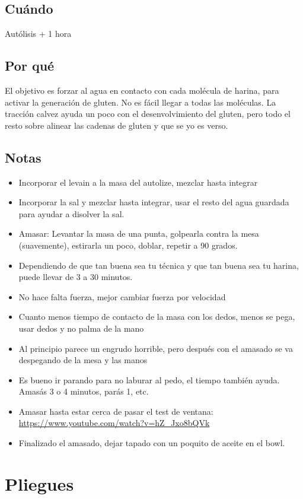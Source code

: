 \documentclass[10pt,a4paper]{article}
\begin{document}
\subsection*{Cuándo}
Autólisis + 1 hora

\subsection*{Por qué}
El objetivo es forzar al agua en contacto con cada molécula
de harina, para activar la generación de gluten. No es fácil
llegar a todas las moléculas. La tracción calvez ayuda un poco
con el desenvolvimiento del gluten, pero todo el resto sobre alinear
las cadenas de gluten y que se yo es verso.

\subsection*{Notas}
\begin{itemize}
\item Incorporar el levain a la masa del autolize, mezclar hasta integrar
\item Incorporar la sal y mezclar hasta integrar, usar el resto del agua
  guardada para ayudar a disolver la sal.
\item Amasar: Levantar la masa de una punta, golpearla contra la mesa (suavemente),
  estirarla un poco, doblar, repetir a 90 grados.
\item Dependiendo de que tan buena sea tu técnica y que tan buena sea tu
  harina, puede llevar de 3 a 30 minutos.
\item No hace falta fuerza, mejor cambiar fuerza por velocidad
\item Cuanto menos tiempo de contacto de la masa  con los dedos,
  menos se pega, usar dedos y no palma de la mano
\item Al principio parece un engrudo horrible, pero después con
  el amasado se va despegando de la mesa y las manos
\item Es bueno ir parando para no laburar al pedo, el tiempo también ayuda.
  Amasás 3 o 4 minutos, parás 1, etc.
\item Amasar hasta estar cerca de pasar el test de ventana:
  \url{https://www.youtube.com/watch?v=hZ_Jxo8bQVk}
\item Finalizado el amasado, dejar tapado con un poquito de aceite
  en el bowl.

\end{itemize}

\section{Pliegues}
\end{document}
